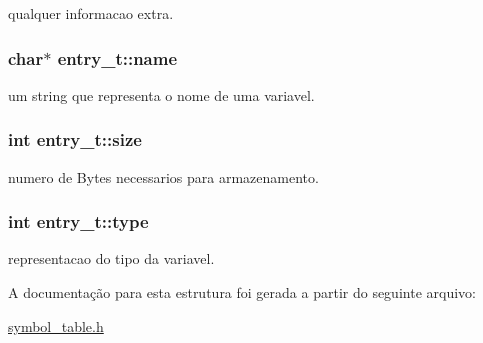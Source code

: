 qualquer informacao extra. \hypertarget{structentry__t_b04f7c44381c01e411be318875eb5eb6}{
\subsubsection[{name}]{\setlength{\rightskip}{0pt plus 5cm}char$\ast$ {\bf entry\_\-t::name}}}
\label{structentry__t_b04f7c44381c01e411be318875eb5eb6}


um string que representa o nome de uma variavel. \hypertarget{structentry__t_67460ae77b6a4433d48f7736ee6a500a}{
\subsubsection[{size}]{\setlength{\rightskip}{0pt plus 5cm}int {\bf entry\_\-t::size}}}
\label{structentry__t_67460ae77b6a4433d48f7736ee6a500a}


numero de Bytes necessarios para armazenamento. \hypertarget{structentry__t_f284680fed934779f16fc2b6a42101b1}{
\subsubsection[{type}]{\setlength{\rightskip}{0pt plus 5cm}int {\bf entry\_\-t::type}}}
\label{structentry__t_f284680fed934779f16fc2b6a42101b1}


representacao do tipo da variavel. 

A documentação para esta estrutura foi gerada a partir do seguinte arquivo:\begin{CompactItemize}
\item 
\hyperlink{symbol__table_8h}{symbol\_\-table.h}\end{CompactItemize}
